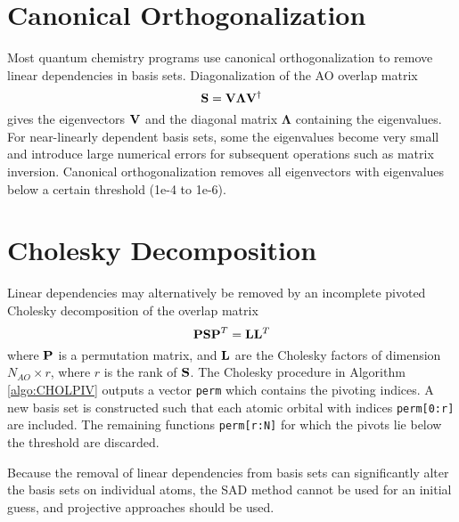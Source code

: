 \section{Canonical Orthogonalization}

Most quantum chemistry programs use canonical orthogonalization \cite{Low1956,Low1970} to remove linear dependencies in basis sets. Diagonalization of the AO overlap matrix
\begin{equation}
\mathbf{S} = \mathbf{V} \boldsymbol{\Lambda} \mathbf{V}^{\dagger}
\end{equation}
\noindent gives the eigenvectors $\mathbf{V}$ and the diagonal matrix $\boldsymbol{\Lambda}$ containing the eigenvalues. For near-linearly dependent basis sets, some the eigenvalues become very small and introduce large numerical errors for subsequent operations such as matrix inversion. Canonical orthogonalization removes all eigenvectors with eigenvalues below a certain threshold (1e-4 to 1e-6).

\section{Cholesky Decomposition}

Linear dependencies may alternatively be removed by an incomplete pivoted Cholesky decomposition of the overlap matrix \cite{Leh2019a} 
\begin{equation}
\mathbf{PSP}^T = \mathbf{L} \mathbf{L}^T
\end{equation}
\noindent where $\mathbf{P}$ is a permutation matrix, and $\mathbf{L}$ are the Cholesky factors of dimension $N_{AO} \times r$, where $r$ is the rank of $\mathbf{S}$. The Cholesky procedure in Algorithm \ref{algo:CHOLPIV} outputs a vector \texttt{perm} which contains the pivoting indices. A new basis set is constructed such that each atomic orbital with indices \texttt{perm[0:r]} are included. The remaining functions \texttt{perm[r:N]} for which the pivots lie below the threshold are discarded. 

Because the removal of linear dependencies from basis sets can significantly alter the basis sets on individual atoms, the SAD method cannot be used for an initial guess, and projective approaches should be used.

